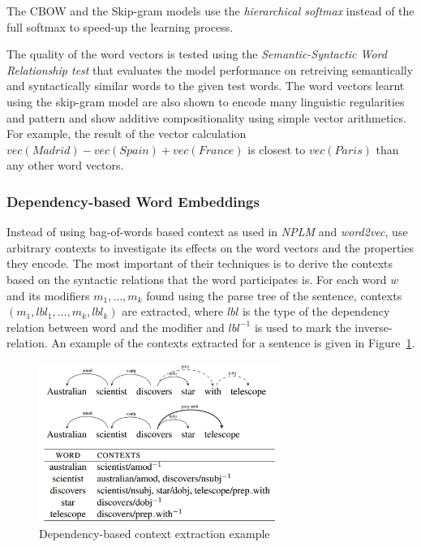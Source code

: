 The CBOW and the Skip-gram models use the \emph{hierarchical softmax} \citep{morin2005hierarchical} instead of the full softmax to speed-up the learning process.

The quality of the word vectors is tested using the \emph{Semantic-Syntactic Word Relationship test} that evaluates the model performance on retreiving semantically and syntactically similar words to the given test words. The word vectors learnt using the skip-gram model are also shown to encode many linguistic regularities and pattern \citep{mikolov2013linguistic} and show additive compositionality using simple vector arithmetics. For example, the result of the vector calculation $vec(Madrid) - vec(Spain) + vec(France)$ is closest to $vec(Paris)$ than any other word vectors.

\subsubsection{Dependency-based Word Embeddings}
Instead of using bag-of-words based context as used in \emph{NPLM} and \emph{word2vec}, \cite{levy2014dependencybased} use arbitrary contexts to investigate its effects on the word vectors and the properties they encode. The most important of their techniques is to derive the contexts based on the syntactic relations that the word participates is. For each word $w$ and its modifiers $m_1, \ldots, m_k$ found using the parse tree of the sentence, contexts $(m_{1}, lbl_{1}, \ldots, m_{k}, lbl_{k})$ are extracted, where $lbl$ is the type of the dependency relation between word and the modifier and $lbl^{-1}$ is used to mark the inverse-relation. An example of the contexts extracted for a sentence is given in Figure~\ref{fig:dep:context}.
\begin{figure}[h!]
    \centering
        \includegraphics[width=0.7\textwidth]{figs/dependency_context.png}
    \caption{Dependency-based context extraction example }
    \label{fig:dep:context}
\end{figure}

